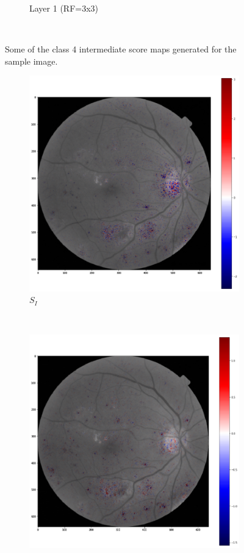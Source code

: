 \documentclass[review]{elsarticle}
\theoremstyle{definition} %
\theoremstyle{remark}
\begin{document}
\begin{figure}[!ht]
\begin{subfigure}{0.45\textwidth}
		\caption{Layer 1 (RF=3x3)}
		\label{fig:score_rf3}
	\end{subfigure}\\
	\caption{Some of the class 4 intermediate score maps generated for the sample image.}
	\label{fig:scoremaps3}
\end{figure}

\begin{figure}[!ht]
	\centering
	\begin{subfigure}{0.45\textwidth}
		\includegraphics[width=\textwidth]{./figures/maps/inp.png}
		\caption{$S_I$}
		\label{fig:score_input}
	\end{subfigure}
	~ %
	\begin{subfigure}{0.45\textwidth}
		\includegraphics[width=\textwidth]{./figures/maps/kmap.png}

\end{subfigure}
\end{figure}
\end{document}
